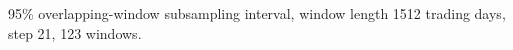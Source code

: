 95\% overlapping-window subsampling interval, window length 1512 trading days, step 21, 123 windows.
